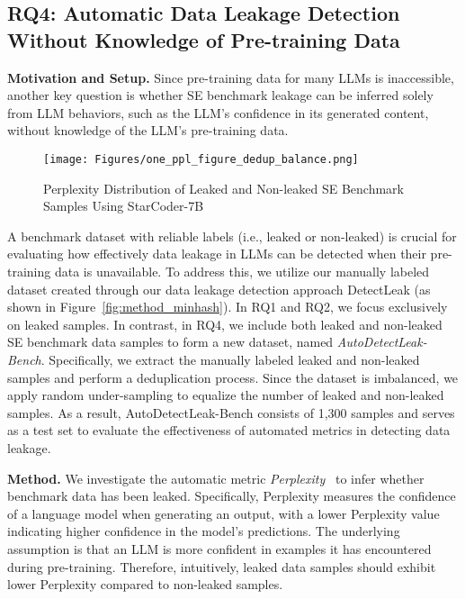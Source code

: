 \subsection{RQ4: Automatic Data Leakage Detection Without Knowledge of Pre-training Data}


\noindent
\textbf{Motivation and Setup.}
Since pre-training data for many LLMs is inaccessible, another key question is whether SE benchmark leakage can be inferred solely from LLM behaviors, such as the LLM's confidence in its generated content, without knowledge of the LLM's pre-training data.



\begin{figure}[b] 
    \centering
    \vspace{-0.6cm}
    \texttt{[image: Figures/one\_ppl\_figure\_dedup\_balance.png]} 
     \vspace{-0.3cm}
    \caption{Perplexity Distribution of Leaked and Non-leaked SE Benchmark Samples Using StarCoder-7B} 
    \label{fig:ppl}
\end{figure}

A benchmark dataset with reliable labels (i.e., leaked or non-leaked) is crucial for evaluating how effectively data leakage in LLMs can be detected when their pre-training data is unavailable. 
To address this, we utilize our manually labeled dataset created through our data leakage detection approach DetectLeak (as shown in Figure~\ref{fig:method_minhash}). In RQ1 and RQ2, we focus exclusively on leaked samples. In contrast, in RQ4, we include both leaked and non-leaked SE benchmark data samples to form a new dataset, named \textit{AutoDetectLeak-Bench}. Specifically, we extract the manually labeled leaked and non-leaked samples and perform a deduplication process. Since the dataset is imbalanced, we apply random under-sampling to equalize the number of leaked and non-leaked samples.
As a result, AutoDetectLeak-Bench consists of 1,300 samples and serves as a test set to evaluate the effectiveness of automated metrics in detecting data leakage.


\vspace{0.2cm}
\noindent
\textbf{Method.}
We investigate the automatic metric \textit{Perplexity}~\cite{Perplexity} to infer whether benchmark data has been leaked. Specifically, Perplexity measures the confidence of a language model when generating an output, with a lower Perplexity value indicating higher confidence in the model's predictions. The underlying assumption is that an LLM is more confident in examples it has encountered during pre-training. Therefore, intuitively, leaked data samples should exhibit lower Perplexity compared to non-leaked samples.


